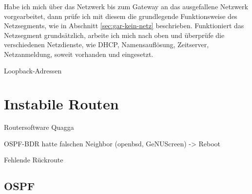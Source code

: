\begin{normaltext}
  Habe ich mich über das Netzwerk bis zum Gateway an das ausgefallene Netzwerk
  vorgearbeitet, dann prüfe ich mit diesem die grundlegende Funktionsweise des
  Netzsegments, wie in Abschnitt \ref{sec:gar-kein-netz} beschrieben.
  Funktioniert das Netzsegment grundsätzlich, arbeite ich mich  nach oben und
  überprüfe die verschiedenen Netzdienste, wie DHCP, Namensauflösung,
  Zeitserver, Netzanmeldung, soweit vorhanden und eingesetzt.

  \begin{Exkursbox}{Loopback-Adressen}
  \end{Exkursbox}
\end{normaltext}

\section{Instabile Routen}
\label{sec:instabile-routen}

\begin{notes}
\item Routersoftware Quagga
\item OSPF-BDR hatte falschen Neighbor (openbsd, GeNUScreen) -> Reboot
\item Fehlende Rückroute
\end{notes}


\subsection*{OSPF}
\label{sec:ospf}

